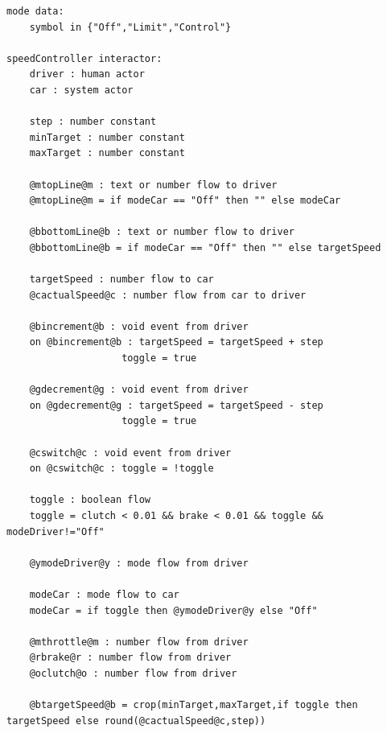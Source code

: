 \documentclass{sigchi}
\begin{document}
\begin{minipage}{\columnwidth}
\begin{lstlisting}[caption=LIL code of the example application, label=lilcode]
mode data:
    symbol in {"Off","Limit","Control"}

speedController interactor:
    driver : human actor
    car : system actor

    step : number constant
    minTarget : number constant
    maxTarget : number constant
    
    @mtopLine@m : text or number flow to driver
    @mtopLine@m = if modeCar == "Off" then "" else modeCar
    
    @bbottomLine@b : text or number flow to driver
    @bbottomLine@b = if modeCar == "Off" then "" else targetSpeed
    
    targetSpeed : number flow to car
    @cactualSpeed@c : number flow from car to driver

    @bincrement@b : void event from driver
    on @bincrement@b : targetSpeed = targetSpeed + step
                    toggle = true
                    
    @gdecrement@g : void event from driver
    on @gdecrement@g : targetSpeed = targetSpeed - step
                    toggle = true
  
    @cswitch@c : void event from driver
    on @cswitch@c : toggle = !toggle
    
    toggle : boolean flow
    toggle = clutch < 0.01 && brake < 0.01 && toggle && modeDriver!="Off" 

    @ymodeDriver@y : mode flow from driver

    modeCar : mode flow to car
    modeCar = if toggle then @ymodeDriver@y else "Off"

    @mthrottle@m : number flow from driver
    @rbrake@r : number flow from driver
    @oclutch@o : number flow from driver
    
    @btargetSpeed@b = crop(minTarget,maxTarget,if toggle then targetSpeed else round(@cactualSpeed@c,step)) 
    \end{lstlisting}
\end{minipage}





%
%
%
%
%
\balance



\end{document}
